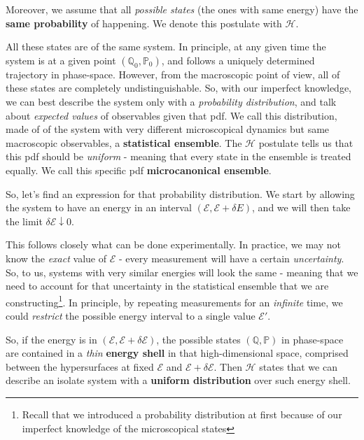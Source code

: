 \documentclass[../template.tex]{subfiles}
\begin{document}
Moreover, we assume that all \textit{possible states} (the ones with same energy) have the \textbf{same probability} of happening. We denote this postulate with $\mathcal{H}$. 

\medskip

All these states are  of the same system. In principle, at any given time the system is at a given point $(\mathbb{Q}_0, \mathbb{P}_0)$, and follows a uniquely determined trajectory in phase-space. However, from the macroscopic point of view, all of these states are completely undistinguishable. So, with our imperfect knowledge, we can best describe the system only with a \textit{probability distribution}, and talk about \textit{expected values} of observables given that pdf. We call this distribution, made of  of the system with very different microscopical dynamics but same macroscopic observables, a \textbf{statistical ensemble}. The $\mathcal{H}$ postulate tells us that this pdf should be \textit{uniform} - meaning that every state in the ensemble is treated equally. We call this specific pdf \textbf{microcanonical ensemble}.   

\medskip

So, let's find an expression for that probability distribution. We start by allowing the system to have an energy in an interval $(\mathcal{E}, \mathcal{E}+\delta E)$, and we will then take the limit $\delta \mathcal{E} \downarrow 0$. 

\medskip

This follows closely what can be done experimentally. In practice, we may not know the \textit{exact} value of $\mathcal{E}$ - every measurement will have a certain \textit{uncertainty}. So, to us, systems with very similar energies will look the same - meaning that we need to account for that uncertainty in the statistical ensemble that we are constructing\footnote{Recall that we introduced a probability distribution at first because of our imperfect knowledge of the microscopical states}. In principle, by repeating measurements for an \textit{infinite} time, we could \textit{restrict} the possible energy interval to a single value $\mathcal{E}'$.

\medskip

So, if the energy is in $(\mathcal{E}, \mathcal{E}+ \delta \mathcal{E})$, the possible states $(\mathbb{Q},\mathbb{P})$ in phase-space are contained in a \textit{thin} \textbf{energy shell} in that high-dimensional space, comprised between the hypersurfaces at fixed $\mathcal{E}$ and $\mathcal{E}+ \delta \mathcal{E}$. Then $\mathcal{H}$ states that we can describe an isolate system with a \textbf{uniform distribution} over such energy shell. 
\end{document}
